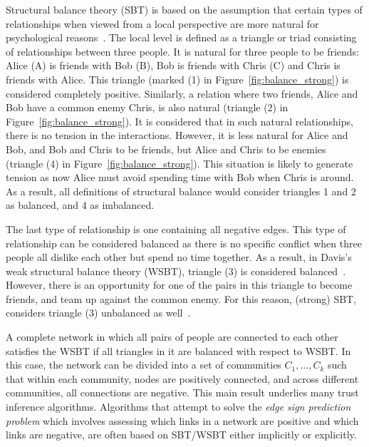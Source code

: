 Structural balance theory (SBT) is based on the assumption that
certain types of relationships when viewed from a local perspective
are more natural for psychological reasons~\cite{kleinberg-book}. The
local level is defined as a triangle or triad consisting of
relationships between three people.  It is natural for three people to
be friends: Alice (A) is friends with Bob (B), Bob is friends with
Chris (C) and Chris is friends with Alice. This triangle (marked (1)
in Figure~\ref{fig:balance_strong}) is considered completely
positive. Similarly, a relation where two friends, Alice and Bob have
a common enemy Chris, is also natural (triangle (2) in
Figure~\ref{fig:balance_strong}). It is considered that in such
natural relationships, there is no tension in the
interactions. However, it is less natural for Alice and Bob, and Bob
and Chris to be friends, but Alice and Chris to be enemies (triangle
(4) in Figure~\ref{fig:balance_strong}). This situation is likely to
generate tension as now Alice must avoid spending time with Bob when
Chris is around. As a result, all definitions of structural balance
would consider triangles 1 and 2 as balanced, and 4 as imbalanced.

The last type of relationship is one containing all negative
edges. This type of relationship can be considered balanced as there
is no specific conflict when three people all dislike each other but
spend no time together. As a result, in Davis's weak structural balance theory
(WSBT), triangle (3) is considered balanced~\cite{kleinberg-book}\cite{Davis:67}.  However, there is an
opportunity for one of the pairs in this triangle to become friends,
and team up against the common enemy. For this reason, (strong) SBT,
considers triangle (3) unbalanced as well~\cite{Cartwright:56}\cite{kleinberg-book}.

A complete network in which all pairs of people are connected to each
other satisfies the WSBT if all triangles in it are balanced with
respect to WSBT. In this case, the network can be divided into a set
of communities $C_1,\ldots, C_k$ such that within each community,
nodes are positively connected, and across different communities, all
connections are negative. This main result underlies many trust
inference algorithms. Algorithms that attempt to solve the {\it edge
  sign prediction problem} which involves assessing which links in a
network are positive and which links are negative, are often based on
SBT/WSBT either implicitly or explicitly.


